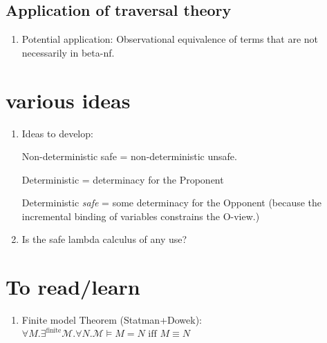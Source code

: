 \documentclass{article}
\begin{document}
\subsection{Application of traversal theory}
\begin{enumerate}
  \item Potential application: Observational equivalence of terms that are not necessarily in beta-nf.
\end{enumerate}

\section{various ideas}
\begin{enumerate}
\item Ideas to develop:

Non-deterministic safe = non-deterministic unsafe.

Deterministic = determinacy for the Proponent

Deterministic \emph{safe} = some determinacy for the Opponent (because the incremental binding of variables constrains the O-view.)

\item Is the safe lambda calculus of any use?
\end{enumerate}



\section{To read/learn}
\begin{enumerate}
\item Finite model Theorem (Statman+Dowek): $\forall M. \exists^{\mbox{finite}} \mathcal{M}. \forall N. \mathcal{M} \models M=N \mbox{ iff } M \equiv N$
\end{enumerate}
\end{document}
